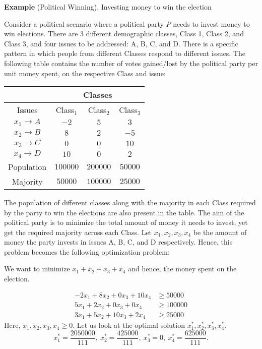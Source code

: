 \documentclass[twoside]{article}
\begin{document}
\textbf{Example} (Political Winning). Investing money to win the election

Consider a political scenario where a political party $P$ needs to invest money
to win elections. There are 3 different demographic classes, Class 1, Class 2,
and Class 3, and four issues to be addressed: A, B, C, and D. There is a
specific pattern in which people from different Classes respond to different
issues. The following table contains the number of votes gained/lost by the
political party per unit money spent, on the respective Class and issue:

\begin{table}[htbp]
  \centering
  \begin{tabular}{|c|c|c|c|}
    \hline
    \multicolumn{1}{|c|}{} & \multicolumn{3}{c|}{Classes} \\
    \hline
    Issues & Class$_1$ & Class$_2$ & Class$_3$  \\
    \hline
    $x_1 \rightarrow A $ & $-2$ & $5$ & $3$  \\
    \hline
    $x_2 \rightarrow B $ & $8$ & $2$ & $-5$  \\
    \hline
    $x_3 \rightarrow C $ & $0$ & $0$ & $10$  \\
    \hline
    $x_4 \rightarrow D $ & $10$ & $0$ & $2$ \\
    \hline
    Population & $100000$ & $200000$ & $50000$\\
    \hline
    Majority & $50000$ & $100000$ & $25000$\\
    \hline
  \end{tabular}
  \label{tab:election_grid}
\end{table}

The population of different classes along with the majority in each Class
required by the party to win the elections are also present in the table. The
aim of the political party is to minimize the total amount of money it needs to
invest, yet get the required majority across each Class. Let $x_1, x_2,x_3,x_4$
be the amount of money the party invests in issues A, B, C, and D respectively.
Hence, this problem becomes the following optimization problem:

We want to minimize $x_1+x_2+x_3+x_4$ and hence, the money spent on the election.

\begin{align}
    -2x_1 + 8x_2 +  0x_3 + 10x_4 &\geq 50000 \\
     5x_1 + 2x_2 +  0x_3 + 0x_4  &\geq 100000 \\
     3x_1 + 5x_2 + 10x_3 + 2x_4  &\geq 25000
\end{align}
Here, $x_1,x_2,x_3,x_4 \geq 0.$ Let us look at the optimal solution
$x_1^*, x_2^*, x_3^*, x_4^*.$ \[
    x_1^* = \frac{2050000}{111},\ x_2^* = \frac{425000}{111},\
    x_3^* = 0,\ x_4^* = \frac{625000}{111}.
\] 
\end{document}
